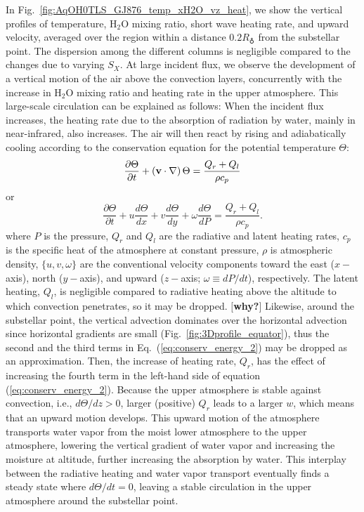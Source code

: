 \documentclass[11pt,numberedappendix,twocolappendix,]{emulateapj}
\def\water{H$_2$O }
\def\memo#1{\color{red}$[${\bf #1}$]$ \color{black}}
\newcommand{\dsa}[1]{{\color{blue}#1}}
\begin{document}
In Fig.~\ref{fig:AqOH0TLS_GJ876_temp_xH2O_vz_heat}, we show the vertical profiles of temperature, \water mixing ratio, short wave heating rate, \dsa{and upward} velocity, averaged over the region \dsa{within a distance $0.2R_\earth$ from the \dsa{substellar} point}. 
The dispersion among the different columns is negligible compared to the changes due to varying $S_X$. 
At large incident flux, we observe the development of \dsa{a} vertical motion of the air above the convection layers, concurrently with the increase in \water mixing ratio \dsa{and heating} rate in the upper atmosphere. 
This large-scale circulation can be explained as \dsa{follows: When} the incident flux increases, the heating rate due to the absorption of radiation by water, mainly in near-infrared, also increases. 
The air will then react by rising and adiabatically cooling according to the conservation equation for the potential temperature $\Theta $:
\begin{equation}
\frac{\partial \Theta }{\partial t} + ( {\bf v} \cdot \nabla ) \, \Theta = \frac{ Q_r + Q_l }{\rho c_p} \label{eq:conserv_energy}
\end{equation}
or
\begin{equation}
\frac{\partial \Theta }{\partial t} + u \frac{d\Theta }{dx} + v\frac{d\Theta }{dy} + \omega \frac{d\Theta }{dP} = \frac{ Q_r + Q_l }{\rho c_p}. \label{eq:conserv_energy_2}
\end{equation}
where $P$ is the pressure, $Q_r$ and $Q_l$ are the radiative and latent heating rates, $c_p$ is the specific heat of the atmosphere \dsa{at constant pressure}, $\rho $ is atmospheric density, $\{ u, v, \omega \}$ are the conventional velocity components toward the east ($x-$axis), north ($y-$axis), and upward ($z-$axis; $\omega \equiv dP/dt$), respectively. 
The latent heating, $Q_l$, is negligible compared to radiative heating above the altitude to which convection penetrates, so it may be dropped. 
\memo{why?}
Likewise, around the \dsa{substellar} point, \dsa{the vertical advection dominates} over the horizontal advection since horizontal gradients are small (Fig.~\ref{fig:3Dprofile_equator}), thus the second and the third terms in Eq.~(\ref{eq:conserv_energy_2}) may be dropped as an approximation. 
Then, the increase of heating rate, $Q_r$, has the effect of increasing the fourth term in the left-hand side of equation (\ref{eq:conserv_energy_2}). 
Because the upper atmosphere is stable against convection, i.e., $d \Theta / d z > 0 $, larger (positive) $Q_r$ leads to a larger $w$, which means that \dsa{an} upward motion develops. 
\dsa{This} upward motion of the atmosphere transports water vapor from the moist lower atmosphere to the upper atmosphere, lowering the vertical gradient of water vapor and increasing the moisture at altitude, further increasing the absorption by water. 
This interplay between the radiative heating and water vapor transport eventually finds \dsa{a} steady state where $d\Theta/dt = 0$, leaving \dsa{a stable} circulation in the upper atmosphere around the \dsa{substellar} point. 
\end{document}
